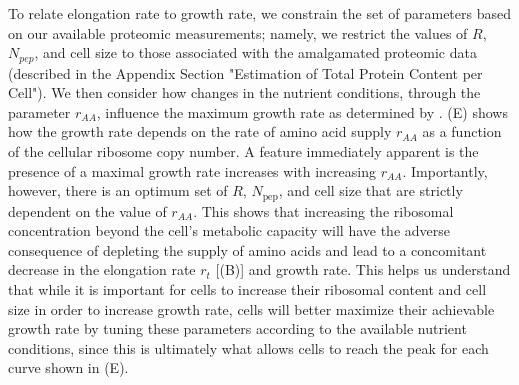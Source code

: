 \begin{figure}
\end{figure}


To relate elongation rate to growth rate, we constrain the set of parameters
based on our available proteomic measurements; namely, we restrict the values of
$R$, $N_{pep}$, and cell size to those associated with the amalgamated proteomic
data (described in the Appendix Section "Estimation of Total Protein Content per
Cell"). We then consider how changes in the nutrient conditions, through the
parameter $r_{AA}$, influence the maximum growth rate as determined by
. (E) shows how the growth rate
depends on the rate of amino acid supply $r_{AA}$ as a function of the cellular
ribosome copy number. A feature immediately apparent is the presence of a
maximal growth rate increases with increasing $r_{AA}$. Importantly, however,
there is an optimum set of $R$, $N_\text{pep}$, and cell size that are strictly
dependent on the value of $r_{AA}$. This shows that increasing the ribosomal
concentration beyond the cell's metabolic capacity will have the adverse
consequence of depleting the supply of amino acids and lead to a concomitant
decrease in the elongation rate $r_t$ [(B)] and
growth rate. This helps us understand that while it is important for cells to
increase their ribosomal content and cell size in order to increase growth rate,
cells will better maximize their achievable growth rate by tuning these
parameters according to the available nutrient conditions, since this is
ultimately what allows cells to reach the peak for each curve shown in
(E).

